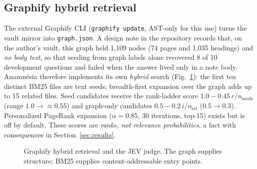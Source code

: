 \documentclass[conference,onecolumn,11pt]{IEEEtran}
\newcommand{\anam}{Anam\-n\'esia}
\begin{document}
\subsection{Graphify hybrid retrieval}\label{sec:graphify}
The external Graphify CLI (\texttt{graphify update}, AST-only for this use) turns the vault mirror into \texttt{graph.json}. A design note in the repository records that, on the author's vault, this graph held 1,109 nodes (74 pages and 1,035 headings) and \emph{no body text}, so that seeding from graph labels alone recovered 8 of 10 development questions and failed when the answer lived only in a note body. \anam{} therefore implements its own \emph{hybrid} search (Fig.~\ref{fig:graph}): the first ten distinct BM25 files are text seeds; breadth-first expansion over the graph adds up to 15 related files. Seed candidates receive the rank-ladder score $1.0-0.45\,r/n_{\text{seeds}}$ (range $1.0\to\approx0.55$) and graph-only candidates $0.5-0.2\,i/n_{\text{rel}}$ ($0.5\to0.3$). Personalized PageRank expansion ($\alpha{=}0.85$, 30 iterations, top-15) exists but is off by default. These scores are \emph{ranks, not relevance probabilities}, a fact with consequences in Section~\ref{sec:results}.

\begin{figure}[!htbp]\centering
{}
\caption{Graphify hybrid retrieval and the JEV judge. The graph supplies structure; BM25 supplies content-addressable entry points.}\label{fig:graph}
\end{figure}
\end{document}
